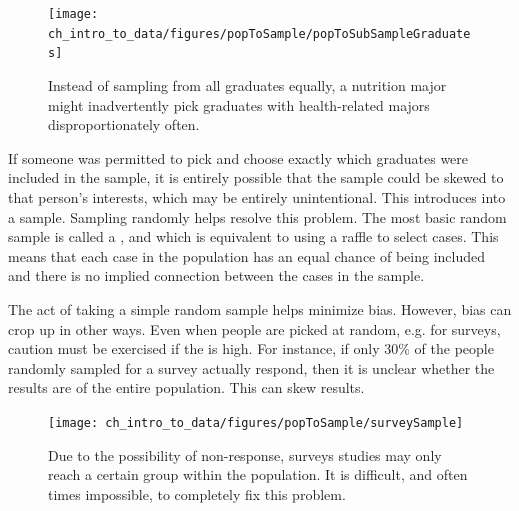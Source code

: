 \begin{figure}
\centering
\texttt{[image: ch\_intro\_to\_data/figures/popToSample/popToSubSampleGraduates]}
\caption{Instead of sampling from all graduates equally, a nutrition major might inadvertently pick graduates with health-related majors disproportionately often.}
\label{popToSubSampleGraduates}
\end{figure}

If someone was permitted to pick and choose exactly which graduates were included in the sample, it is entirely possible that the sample could be skewed to that person's interests, which may be entirely unintentional. This introduces  into a sample. Sampling randomly helps resolve this problem. The most basic random sample is called a , and which is equivalent to using a raffle to select cases. This means that each case in the population has an equal chance of being included and there is no implied connection between the cases in the sample.


The act of taking a simple random sample helps minimize bias. However, bias can crop up in other ways.
Even when people are picked at random, e.g. for surveys, caution must be exercised if the   is high. For instance, if only 30\% of the people randomly sampled for a survey actually respond, then it is unclear whether the results are  of the entire population. This   can skew results.

\begin{figure}[h]
\centering
\texttt{[image: ch\_intro\_to\_data/figures/popToSample/surveySample]}
\caption{Due to the possibility of non-response, surveys studies may only reach a certain group within the population. It is difficult, and often times impossible, to completely fix this problem.}
\label{surveySample}
\end{figure}

